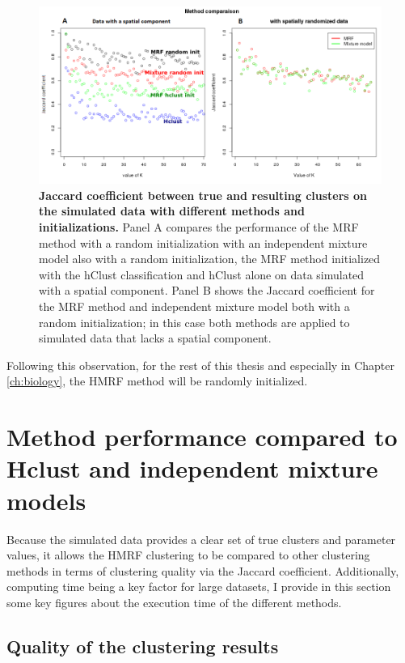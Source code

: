 	\begin{figure}[h]
\centerline{\includegraphics[width=0.9\linewidth]{gfx/chapter5/method_comparison.png}}
\caption{{\bf Jaccard coefficient between true and resulting clusters on the simulated data with different methods and initializations.} Panel A compares the performance of the MRF method with a random initialization with an independent mixture model also with a random initialization, the MRF method initialized with the hClust classification and hClust alone on data simulated with a spatial component. Panel B shows the Jaccard coefficient for the MRF method and independent mixture model both with a random initialization; in this case both methods are applied to simulated data that lacks a spatial component.}
\label{fig:methodComparison}
	\end{figure}

Following this observation, for the rest of this thesis and especially in Chapter \ref{ch:biology}, the HMRF method will be randomly initialized.

\section{Method performance compared to Hclust and independent mixture models}
 Because the simulated data provides a clear set of true clusters and parameter values, it allows the HMRF clustering to be compared to other clustering methods in terms of clustering quality via the Jaccard coefficient. Additionally, computing time being a key factor for large datasets, I provide in this section some key figures about the execution time of the different methods.
	\subsection{Quality of the clustering results}
	
